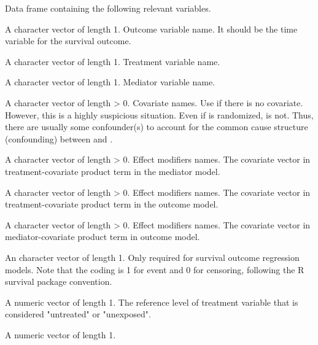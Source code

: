 \documentclass[a4paper]{book}
\begin{document}
%
\begin{Arguments}
\begin{ldescription}
\item[\code{data}] Data frame containing the following relevant variables.

\item[\code{yvar}] A character vector of length 1. Outcome variable name. It should be the time variable for the survival outcome.

\item[\code{avar}] A character vector of length 1. Treatment variable name.

\item[\code{mvar}] A character vector of length 1. Mediator variable name.

\item[\code{cvar}] A character vector of length > 0. Covariate names. Use  if there is no covariate. However, this is a highly suspicious situation. Even if  is randomized,  is not. Thus, there are usually some confounder(s) to account for the common cause structure (confounding) between  and .

\item[\code{emm\_ac\_mreg}] A character vector of length > 0. Effect modifiers names. The covariate vector in treatment-covariate product term in the mediator model.

\item[\code{emm\_ac\_yreg}] A character vector of length > 0. Effect modifiers names. The covariate vector in treatment-covariate product term in the outcome model.

\item[\code{emm\_mc\_yreg}] A character vector of length > 0. Effect modifiers names. The covariate vector in mediator-covariate product term in outcome model.

\item[\code{eventvar}] An character vector of length 1. Only required for survival outcome regression models. Note that the coding is 1 for event and 0 for censoring, following the R survival package convention.

\item[\code{a0}] A numeric vector of length 1. The reference level of treatment variable that is considered "untreated" or "unexposed".

\item[\code{a1}] A numeric vector of length 1.


\end{ldescription}
\end{Arguments}
\end{document}
